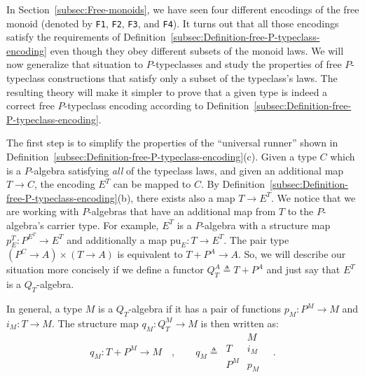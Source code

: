 In Section~\ref{subsec:Free-monoids}, we have seen four different
encodings of the free monoid (denoted by \lstinline!F1!,
\lstinline!F2!, \lstinline!F3!,
and \lstinline!F4!). It
turns out that all those encodings satisfy the requirements of Definition~\ref{subsec:Definition-free-P-typeclass-encoding}
even though they obey different subsets of the monoid laws. We will
now generalize that situation to $P$-typeclasses and study the properties
of free $P$-typeclass constructions that satisfy only a subset of
the typeclass\textsf{'}s laws. The resulting theory will make it simpler to
prove that a given type is indeed a correct free $P$-typeclass encoding
according to Definition~\ref{subsec:Definition-free-P-typeclass-encoding}.

The first step is to simplify the properties of the \textsf{``}universal runner\textsf{''}
shown in Definition~\ref{subsec:Definition-free-P-typeclass-encoding}(c).
Given a type $C$ which is a $P$-algebra satisfying \emph{all} of
the typeclass laws, and given an additional map $T\rightarrow C$,
the encoding $E^{T}$ can be mapped to $C$. By Definition~\ref{subsec:Definition-free-P-typeclass-encoding}(b),
there exists also a map $T\rightarrow E^{T}$. We notice that we are
working with $P$-algebras that have an additional map from $T$ to
the $P$-algebra\textsf{'}s carrier type. For example, $E^{T}$ is a $P$-algebra
with a structure map $p_{E}^{T}:P^{E^{T}}\rightarrow E^{T}$ and additionally
a map $\text{pu}_{E}:T\rightarrow E^{T}$. The pair type $(P^{C}\rightarrow A)\times(T\rightarrow A)$
is equivalent to $T+P^{A}\rightarrow A$. So, we will describe our
situation more concisely if we define a functor $Q_{T}^{A}\triangleq T+P^{A}$
and just say that $E^{T}$ is a $Q_{T}$-algebra.

In general, a type $M$ is a $Q_{T}$-algebra if it has a pair of
functions $p_{M}:P^{M}\rightarrow M$ and $i_{M}:T\rightarrow M$.
The structure map $q_{M}:Q_{T}^{M}\rightarrow M$ is then written
as:
\[
q_{M}:T+P^{M}\rightarrow M\quad,\quad\quad q_{M}\triangleq\,\begin{array}{|c||c|}
 & M\\
\hline T & i_{M}\\
P^{M} & p_{M}
\end{array}\quad.
\]

